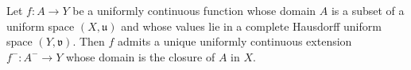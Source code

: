 Let $f : A \to Y$ be a uniformly continuous function whose domain $A$ is a subset of a uniform space $(X, \mathfrak{u})$ and whose values lie in a complete Hausdorff uniform space $(Y, \mathfrak{v})$. Then $f$ admits a unique uniformly continuous extension $f^{-} : A^{-} \to Y$ whose domain is the closure of $A$ in $X$.
